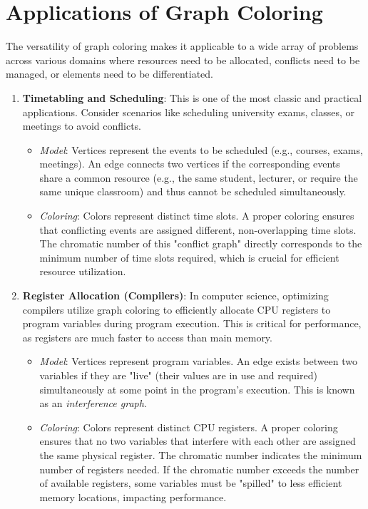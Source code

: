 \documentclass[11pt, a4paper]{article}
\begin{document}
\section{Applications of Graph Coloring}
The versatility of graph coloring makes it applicable to a wide array of problems across various domains where resources need to be allocated, conflicts need to be managed, or elements need to be differentiated.

\begin{enumerate}[noitemsep,topsep=3pt,parsep=3pt,partopsep=0pt]
    \item \textbf{Timetabling and Scheduling}: This is one of the most classic and practical applications. Consider scenarios like scheduling university exams, classes, or meetings to avoid conflicts.
    \begin{itemize}
        \item \textit{Model}: Vertices represent the events to be scheduled (e.g., courses, exams, meetings). An edge connects two vertices if the corresponding events share a common resource (e.g., the same student, lecturer, or require the same unique classroom) and thus cannot be scheduled simultaneously.
        \item \textit{Coloring}: Colors represent distinct time slots. A proper coloring ensures that conflicting events are assigned different, non-overlapping time slots. The chromatic number of this "conflict graph" directly corresponds to the minimum number of time slots required, which is crucial for efficient resource utilization.
    \end{itemize}
    \item \textbf{Register Allocation (Compilers)}: In computer science, optimizing compilers utilize graph coloring to efficiently allocate CPU registers to program variables during program execution. This is critical for performance, as registers are much faster to access than main memory.
    \begin{itemize}
        \item \textit{Model}: Vertices represent program variables. An edge exists between two variables if they are "live" (their values are in use and required) simultaneously at some point in the program's execution. This is known as an \textit{interference graph}.
        \item \textit{Coloring}: Colors represent distinct CPU registers. A proper coloring ensures that no two variables that interfere with each other are assigned the same physical register. The chromatic number indicates the minimum number of registers needed. If the chromatic number exceeds the number of available registers, some variables must be "spilled" to less efficient memory locations, impacting performance.

\end{itemize}
\end{enumerate}
\end{document}
